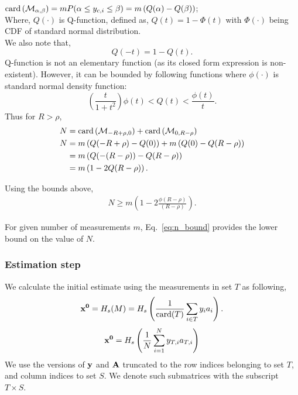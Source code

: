  $\mathrm{card}\left(\mathcal{M}_{\alpha,\beta}\right)=mP(\alpha \leq y_{c,i}\leq \beta) = m\left(Q(\alpha)- Q(\beta)\right)$; \\
Where, $Q(\cdot)$ is Q-function, defined as, $Q(t) = 1-\Phi(t)$ with $\Phi(\cdot)$ being CDF of standard normal distribution. \\
We also note that,
 $$Q(-t) = 1 - Q(t).$$
Q-function is not an elementary function (as its closed form expression is non-existent). However, it can be bounded by following functions where $\phi(\cdot)$ is standard normal density function:
$$
\left(\frac{t}{1+t^2}\right)\phi(t) < Q(t) < \frac{\phi(t)}{t}.
$$
Thus for $R > \rho$,
\begin{align}
N & = \mathrm{card}\left(\mathcal{M}_{-R + \rho,0}\right) + \mathrm{card}\left(\mathcal{M}_{0, R-\rho}\right) \nonumber \\
N &  = m\left(Q(-R+\rho)- Q(0)\right) + m\left(Q(0)- Q(R-\rho)\right) \nonumber \\
& = m\left(Q(-(R-\rho))- Q(R-\rho)\right) \nonumber \\
& = m\left(1-2Q(R-\rho)\right). \nonumber
\end{align}

Using the bounds above,
\begin{align}
N \geq m \left(1-2\frac{\phi(R-\rho)}{(R-\rho)} \right).
\label{eq:n_bound}
\end{align}
%

For given number of measurements $m$, Eq.~\ref{eq:n_bound} provides the lower bound on the value of $N$.
\subsubsection{Estimation step}
We calculate the initial estimate using the measurements in set $T$ as following,
$$
\mathbf{{x}^0} = H_s(M) = H_s\left(\frac{1}{\mathrm{card}(T)}\sum_{i\in T}y_{i}a_{i}\right).
$$
$$
\mathbf{x^0} = H_s\left( \frac{1}{N}\sum_{i=1}^{N}y_{T,i}a_{T,i}\right)
$$
We use the versions of $\mathbf{y}$ and $\mathbf{A}$ truncated to the row indices belonging to set $T$, and column indices to set $S$. We denote such submatrices with the subscript $T\times S$. 

